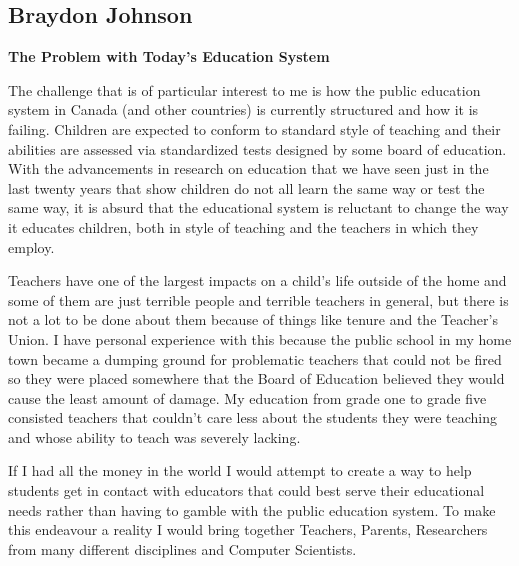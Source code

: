 \documentclass[12pt,letterpaper]{article}
\begin{document}
\subsection{Braydon Johnson}
\textbf{The Problem with Today's Education System}\par
The challenge that is of particular interest to me is how the public education system in Canada (and other countries) is currently structured and how it is failing. Children are expected to conform to standard style of teaching and their abilities are assessed via standardized tests designed by some board of education. With the advancements in research on education that we have seen just in the last twenty years that show children do not all learn the same way or test the same way, it is absurd that the educational system is reluctant to change the way it educates children, both in style of teaching and the teachers in which they employ.\par
Teachers have one of the largest impacts on a child's life outside of the home and some of them are just terrible people and terrible teachers in general,  but there is not a lot to be done about them because of things like tenure and the Teacher's Union. I have personal experience with this because the public school in my home town became a dumping ground for problematic teachers that could not be fired so they were placed somewhere that the Board of Education believed they would cause the least amount of damage. My education from grade one to grade five consisted teachers that couldn't care less about the students they were teaching and whose ability to teach was severely lacking.\par
If I had all the money in the world I would attempt to create a way to help students get in contact with educators that could best serve their educational needs rather than having to gamble with the public education system. To make this endeavour a reality I would bring together Teachers, Parents, Researchers from many different disciplines and Computer Scientists.
\end{document}
